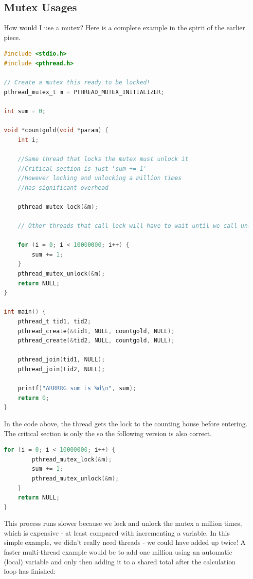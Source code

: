 \subsection{Mutex Usages}

How would I use a mutex?
Here is a complete example in the spirit of the earlier piece.

\begin{lstlisting}[language=C]
#include <stdio.h>
#include <pthread.h>

// Create a mutex this ready to be locked!
pthread_mutex_t m = PTHREAD_MUTEX_INITIALIZER;

int sum = 0;

void *countgold(void *param) {
    int i;

    //Same thread that locks the mutex must unlock it
    //Critical section is just 'sum += 1'
    //However locking and unlocking a million times
    //has significant overhead

    pthread_mutex_lock(&m);

    // Other threads that call lock will have to wait until we call unlock

    for (i = 0; i < 10000000; i++) {
        sum += 1;
    }
    pthread_mutex_unlock(&m);
    return NULL;
}

int main() {
    pthread_t tid1, tid2;
    pthread_create(&tid1, NULL, countgold, NULL);
    pthread_create(&tid2, NULL, countgold, NULL);

    pthread_join(tid1, NULL);
    pthread_join(tid2, NULL);

    printf("ARRRRG sum is %d\n", sum);
    return 0;
}
\end{lstlisting}

In the code above, the thread gets the lock to the counting house before entering.
The critical section is only the  so the following version is also correct.

\begin{lstlisting}[language=C]
    for (i = 0; i < 10000000; i++) {
        pthread_mutex_lock(&m);
        sum += 1;
        pthread_mutex_unlock(&m);
    }
    return NULL;
}
\end{lstlisting}

This process runs slower because we lock and unlock the mutex a million times, which is expensive - at least compared with incrementing a variable.
In this simple example, we didn't really need threads - we could have added up twice!
A faster multi-thread example would be to add one million using an automatic (local) variable and only then adding it to a shared total after the calculation loop has finished:

